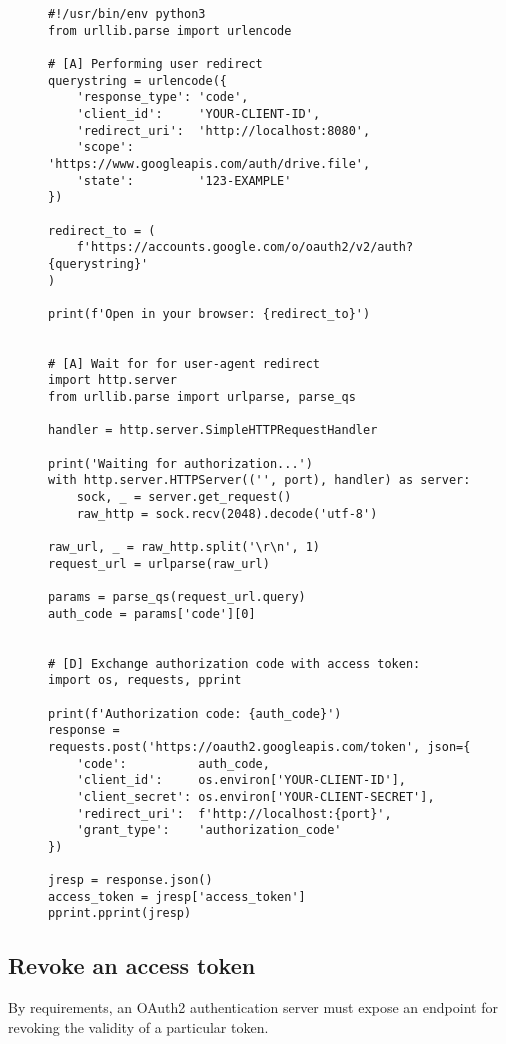 \begin{figure}[h!]
    \begin{lstlisting}[label={lst:code}, caption={Obtain the access token with grant type authorization code}]
#!/usr/bin/env python3
from urllib.parse import urlencode

# [A] Performing user redirect
querystring = urlencode({
    'response_type': 'code',
    'client_id':     'YOUR-CLIENT-ID',
    'redirect_uri':  'http://localhost:8080',
    'scope':         'https://www.googleapis.com/auth/drive.file',
    'state':         '123-EXAMPLE'
})

redirect_to = (
    f'https://accounts.google.com/o/oauth2/v2/auth?{querystring}'
)

print(f'Open in your browser: {redirect_to}')


# [A] Wait for for user-agent redirect
import http.server
from urllib.parse import urlparse, parse_qs

handler = http.server.SimpleHTTPRequestHandler

print('Waiting for authorization...')
with http.server.HTTPServer(('', port), handler) as server:
    sock, _ = server.get_request()
    raw_http = sock.recv(2048).decode('utf-8')

raw_url, _ = raw_http.split('\r\n', 1)
request_url = urlparse(raw_url)

params = parse_qs(request_url.query)
auth_code = params['code'][0]


# [D] Exchange authorization code with access token:
import os, requests, pprint

print(f'Authorization code: {auth_code}')
response = requests.post('https://oauth2.googleapis.com/token', json={
    'code':          auth_code,
    'client_id':     os.environ['YOUR-CLIENT-ID'],
    'client_secret': os.environ['YOUR-CLIENT-SECRET'],
    'redirect_uri':  f'http://localhost:{port}',
    'grant_type':    'authorization_code'
})

jresp = response.json()
access_token = jresp['access_token']
pprint.pprint(jresp)

\end{lstlisting}
\end{figure}

\subsection{Revoke an access token}
By requirements, an OAuth2 authentication server must expose an endpoint for
revoking the validity of a particular token.
